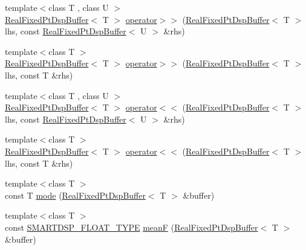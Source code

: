\begin{DoxyCompactItemize}
\item 
{\footnotesize template$<$class T , class U $>$ }\\\hyperlink{class_smart_dsp_1_1_real_fixed_pt_dsp_buffer}{Real\+Fixed\+Pt\+Dsp\+Buffer}$<$ T $>$ \hyperlink{namespace_smart_dsp_afab544ed248b3af9fb2c089617ebd474}{operator$>$$>$} (\hyperlink{class_smart_dsp_1_1_real_fixed_pt_dsp_buffer}{Real\+Fixed\+Pt\+Dsp\+Buffer}$<$ T $>$ lhs, const \hyperlink{class_smart_dsp_1_1_real_fixed_pt_dsp_buffer}{Real\+Fixed\+Pt\+Dsp\+Buffer}$<$ U $>$ \&rhs)
\item 
{\footnotesize template$<$class T $>$ }\\\hyperlink{class_smart_dsp_1_1_real_fixed_pt_dsp_buffer}{Real\+Fixed\+Pt\+Dsp\+Buffer}$<$ T $>$ \hyperlink{namespace_smart_dsp_a0081df73e99027f93fe65158ed027b66}{operator$>$$>$} (\hyperlink{class_smart_dsp_1_1_real_fixed_pt_dsp_buffer}{Real\+Fixed\+Pt\+Dsp\+Buffer}$<$ T $>$ lhs, const T \&rhs)
\item 
{\footnotesize template$<$class T , class U $>$ }\\\hyperlink{class_smart_dsp_1_1_real_fixed_pt_dsp_buffer}{Real\+Fixed\+Pt\+Dsp\+Buffer}$<$ T $>$ \hyperlink{namespace_smart_dsp_a3db421cd6fc7c1bde1f8230bf3af50d7}{operator$<$$<$} (\hyperlink{class_smart_dsp_1_1_real_fixed_pt_dsp_buffer}{Real\+Fixed\+Pt\+Dsp\+Buffer}$<$ T $>$ lhs, const \hyperlink{class_smart_dsp_1_1_real_fixed_pt_dsp_buffer}{Real\+Fixed\+Pt\+Dsp\+Buffer}$<$ U $>$ \&rhs)
\item 
{\footnotesize template$<$class T $>$ }\\\hyperlink{class_smart_dsp_1_1_real_fixed_pt_dsp_buffer}{Real\+Fixed\+Pt\+Dsp\+Buffer}$<$ T $>$ \hyperlink{namespace_smart_dsp_a4dea660df0c4b56bc3a6316e3433e2e0}{operator$<$$<$} (\hyperlink{class_smart_dsp_1_1_real_fixed_pt_dsp_buffer}{Real\+Fixed\+Pt\+Dsp\+Buffer}$<$ T $>$ lhs, const T \&rhs)
\item 
{\footnotesize template$<$class T $>$ }\\const T \hyperlink{namespace_smart_dsp_a46754dfb8fcb810e202ea4dbcd666e82}{mode} (\hyperlink{class_smart_dsp_1_1_real_fixed_pt_dsp_buffer}{Real\+Fixed\+Pt\+Dsp\+Buffer}$<$ T $>$ \&buffer)
\item 
{\footnotesize template$<$class T $>$ }\\const \hyperlink{_dsp_buffer_8h_a9ed4123d332590f7a6161bc2061eac49}{S\+M\+A\+R\+T\+D\+S\+P\+\_\+\+F\+L\+O\+A\+T\+\_\+\+T\+Y\+P\+E} \hyperlink{namespace_smart_dsp_a7ae242ce2ba98db6c6a8ecef99a1e1e9}{mean\+F} (\hyperlink{class_smart_dsp_1_1_real_fixed_pt_dsp_buffer}{Real\+Fixed\+Pt\+Dsp\+Buffer}$<$ T $>$ \&buffer)

\end{DoxyCompactItemize}
